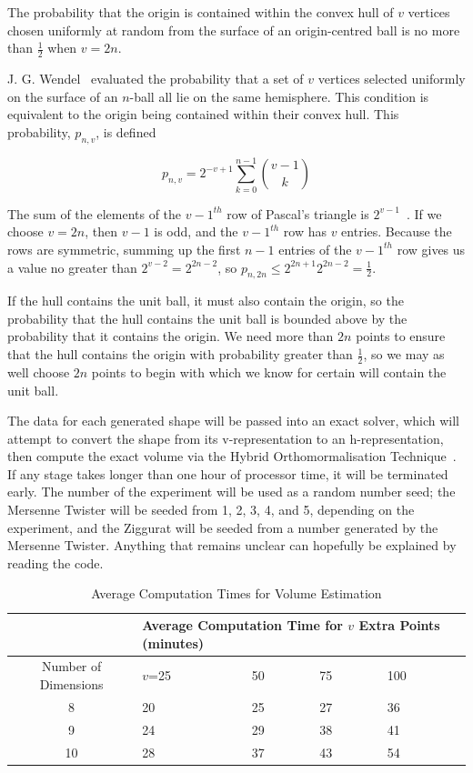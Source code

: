 \begin{proposition}
The probability that the origin is contained within the convex hull of $v$ vertices chosen uniformly at random from the surface of an origin-centred ball is no more than $\frac{1}{2}$ when $v = 2n$.
\end{proposition}

J. G. Wendel~\cite{Wendel62} evaluated the probability that a set of $v$ vertices selected uniformly on the surface of an $n$-ball all lie on the same hemisphere. This condition is equivalent to the origin being contained within their convex hull. This probability, $p_{n,v}$, is defined

$$
p_{n,v} = 2^{-v+1} \sum_{k=0}^{n-1} {{v-1} \choose k}
$$

The sum of the elements of the $v-1^{th}$ row of Pascal's triangle is $2^{v-1}$~\cite{mathworld_pascal}. If we choose $v = 2n$, then $v-1$ is odd, and the $v-1^{th}$ row has $v$ entries. Because the rows are symmetric, summing up the first $n-1$ entries of the $v-1^{th}$ row gives us a value no greater than $2^{v-2} = 2^{2n-2}$, so $p_{n, 2n} \leqslant 2^{2n+1} 2^{2n-2} = \frac{1}{2}$.

If the hull contains the unit ball, it must also contain the origin, so the probability that the hull contains the unit ball is bounded above by the probability that it contains the origin. We need more than $2n$ points to ensure that the hull contains the origin with probability greater than $\frac{1}{2}$, so we may as well choose $2n$ points to begin with which we know for certain will contain the unit ball.

The data for each generated shape will be passed into an exact solver, which will attempt to convert the shape from its v-representation to an h-representation, then compute the exact volume via the Hybrid Orthomormalisation Technique~\cite{Bueler98}. If any stage takes longer than one hour of processor time, it will be terminated early. The number of the experiment will be used as a random number seed; the Mersenne Twister will be seeded from 1, 2, 3, 4, and 5, depending on the experiment, and the Ziggurat will be seeded from a number generated by the Mersenne Twister. Anything that remains unclear can hopefully be explained by reading the code. %

\begin{table}[h]
\centering
\begin{tabular}{| c || p{1cm} | p{1cm} | p{1cm} | p{1cm}|}
\hline
&\multicolumn{4}{p{5cm}|}{Average Computation Time for $v$ Extra Points (minutes)} \\
\hline
Number of Dimensions & $v$=25 & 50 & 75 & 100\\
\hline
8  & 20 & 25 & 27 & 36 \\
9  & 24 & 29 & 38 & 41 \\
10 & 28 & 37 & 43 & 54 \\
\hline
\end{tabular}
\caption{Average Computation Times for Volume Estimation}
\label{tab_estimation_time}
\end{table}

